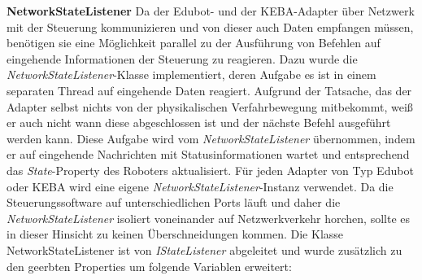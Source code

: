 \textbf{NetworkStateListener}
\newline
Da der Edubot- und der KEBA-Adapter über Netzwerk mit der Steuerung kommunizieren und von dieser auch Daten empfangen müssen, benötigen sie eine Möglichkeit parallel zu der Ausführung von Befehlen auf eingehende Informationen der Steuerung zu reagieren. 
\newline
Dazu wurde die \textit{NetworkStateListener}-Klasse implementiert, deren Aufgabe es ist in einem separaten Thread auf eingehende Daten reagiert. Aufgrund der Tatsache, das der Adapter selbst nichts von der physikalischen Verfahrbewegung mitbekommt, weiß er auch nicht wann diese abgeschlossen ist und der nächste Befehl ausgeführt werden kann. Diese Aufgabe wird vom \textit{NetworkStateListener} übernommen, indem er auf eingehende Nachrichten mit Statusinformationen wartet und entsprechend das \textit{State}-Property des Roboters aktualisiert.
\newline
Für jeden Adapter von Typ Edubot oder KEBA wird eine eigene \textit{NetworkStateListener}-Instanz verwendet. Da die Steuerungssoftware auf unterschiedlichen Ports läuft und daher die \textit{NetworkStateListener} isoliert voneinander auf Netzwerkverkehr horchen, sollte es in dieser Hinsicht zu keinen Überschneidungen kommen.
Die Klasse NetworkStateListener ist von \textit{IStateListener} abgeleitet und wurde zusätzlich zu den geerbten Properties um folgende Variablen erweitert:
